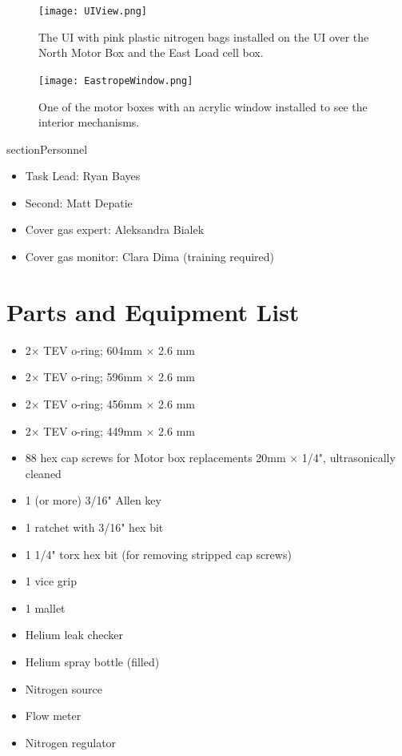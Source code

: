 \documentclass[11pt]{article}
\begin{document}
\begin{figure}[htbp]
\begin{center}
\texttt{[image: UIView.png]}
\caption{The UI with pink plastic nitrogen bags installed on the UI over the North Motor Box and the East Load cell box.}
\label{fig:UI}
\end{center}
\end{figure}


\begin{figure}[htbp]
\begin{center}
\texttt{[image: EastropeWindow.png]}
\caption{One of the motor boxes with an acrylic window installed to see the interior mechanisms.}
\label{fig:eastrope}
\end{center}
\end{figure}

section{Personnel}
\begin{itemize}
\item Task Lead: Ryan Bayes
\item Second: Matt Depatie
\item Cover gas expert: Aleksandra Bialek
\item Cover gas monitor: Clara Dima (training required)
\end{itemize}


\section{Parts and Equipment List}
\begin{itemize}
	\item 2$\times$ TEV o-ring; 604mm $\times$ 2.6 mm
	\item 2$\times$ TEV o-ring; 596mm $\times$ 2.6 mm
	\item 2$\times$ TEV o-ring; 456mm $\times$ 2.6 mm
	\item 2$\times$ TEV o-ring; 449mm $\times$ 2.6 mm
	\item 88 hex cap screws for Motor box replacements 20mm $\times$ 1/4", ultrasonically cleaned
	\item 1 (or more) 3/16" Allen key
	\item 1 ratchet with 3/16" hex bit
	\item 1 1/4" torx hex bit (for removing stripped cap screws)
	\item 1 vice grip
	\item 1 mallet
	\item Helium leak checker
	\item Helium spray bottle (filled)
	\item Nitrogen source
	\item Flow meter
	\item Nitrogen regulator
\end{itemize}
\end{document}
